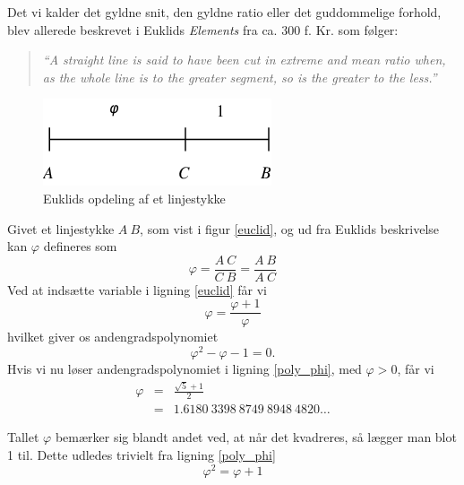 {
Det vi kalder det gyldne snit, den gyldne ratio eller det guddommelige
forhold, blev allerede beskrevet i Euklids \emph{Elements} fra ca. 300
f.  Kr. som følger:
\begin{quote}
	\emph{``A straight line is said to have been cut in extreme
	and mean ratio when, as the whole line is to the greater
	segment, so is the greater to the less.''}\cite{Euclid300bc}
\end{quote}

\begin{figure}[h!]
	\begin{center}
		\includegraphics[scale=0.49,angle=0]{afsnit/baggrund/billeder/line_segment_a_c_b}
	\end{center}
	\caption{Euklids opdeling af et linjestykke}
	\label{line_segment}
\end{figure}

Givet et linjestykke $A\ B$, som vist i figur \ref{euclid}, og ud fra
Euklids beskrivelse kan $\varphi$ defineres som
\begin{equation}
	\varphi	= \frac{A\ C}{C\ B} = \frac{A\ B}{A\ C}
	\label{euclid}
\end{equation}
Ved at indsætte variable i ligning \ref{euclid} får vi
\begin{equation}
	\varphi = \frac{\varphi + 1}{\varphi}
	\label{expand_euclid}
\end{equation}
hvilket giver os andengradspolynomiet
\begin{equation}
	\varphi^{2} - \varphi - 1 = 0.
	\label{poly_phi}
\end{equation}
Hvis vi nu løser andengradspolynomiet i ligning \ref{poly_phi}, med
$\varphi > 0$, får vi
\begin{eqnarray*}
	\varphi	& =	& \frac{\sqrt{5} + 1}{2} \\
		& =	& 1.6180\ 3398\ 8749\ 8948\ 4820 \dots
\end{eqnarray*}

Tallet $\varphi$ bemærker sig blandt andet ved, at når det kvadreres, så
lægger man blot 1 til. Dette udledes trivielt fra ligning \ref{poly_phi}
\begin{equation}
	\varphi^{2} = \varphi + 1
	\label{phi_squared}
\end{equation}

}
